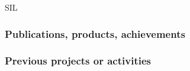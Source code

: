 \begin{sitedescription}{SIL}
\subsubsection*{Publications, products, achievements}

\begin{compactenum}
\item {}
\end{compactenum}

\subsubsection*{Previous projects or activities}

\begin{compactenum}
\item {}
\end{compactenum}


\end{sitedescription}
